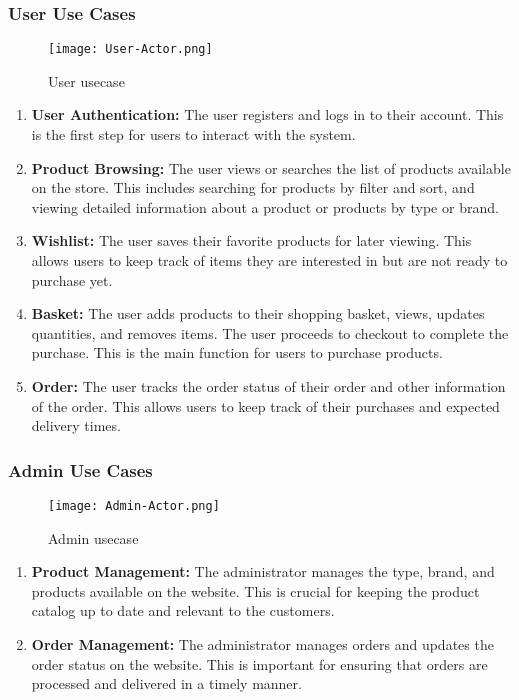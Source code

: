 \subsubsection{User Use Cases}
\begin{figure}[H]
    \texttt{[image: User-Actor.png]}
    \caption{User usecase}
    \label{fig:admin-user-usercase}
\end{figure}
\begin{enumerate}
    \item \textbf{User Authentication:} The user registers and logs in to their account. This is the first step for users to interact with the system.
    \item \textbf{Product Browsing:} The user views or searches the list of products available on the store. This includes searching for products by filter and sort, and viewing detailed information about a product or products by type or brand.
    \item \textbf{Wishlist:} The user saves their favorite products for later viewing. This allows users to keep track of items they are interested in but are not ready to purchase yet.
    \item \textbf{Basket:} The user adds products to their shopping basket, views, updates quantities, and removes items. The user proceeds to checkout to complete the purchase. This is the main function for users to purchase products.
    \item \textbf{Order:} The user tracks the order status of their order and other information of the order. This allows users to keep track of their purchases and expected delivery times.
\end{enumerate}
\subsubsection{Admin Use Cases}
\begin{figure}[H]
    \texttt{[image: Admin-Actor.png]}
    \caption{Admin usecase}
    \label{fig:admin-admin-usecase}
\end{figure}
\begin{enumerate}
    \item \textbf{Product Management:} The administrator manages the type, brand, and products available on the website. This is crucial for keeping the product catalog up to date and relevant to the customers.
    \item \textbf{Order Management:} The administrator manages orders and updates the order status on the website. This is important for ensuring that orders are processed and delivered in a timely manner.
\end{enumerate}
